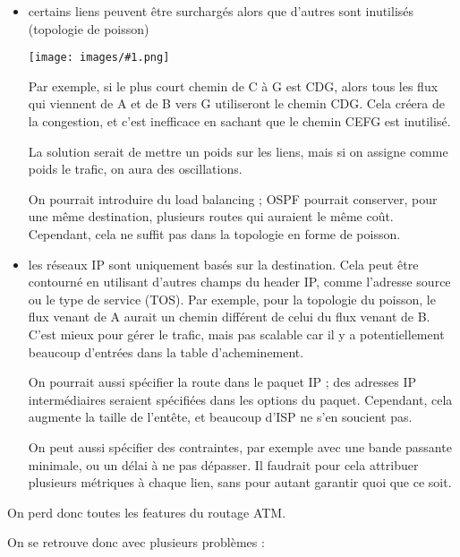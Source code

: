 \documentclass[10pt,a4paper]{report}
\newcommand{\dessin}[1]{\begin{center}\texttt{[image: images/\#1.png]}\end{center}}
\begin{document}
			\begin{itemize}
				\item certains liens peuvent être surchargés alors que d'autres sont inutilisés (topologie de poisson)
				
				\dessin{17}
				
				Par exemple, si le plus court chemin de C à G est CDG, alors tous les flux qui viennent de A et de B vers G utiliseront le chemin CDG. Cela créera de la congestion, et c'est inefficace en sachant que le chemin CEFG est inutilisé.
				
				La solution serait de mettre un poids sur les liens, mais si on assigne comme poids le trafic, on aura des oscillations.
				
				On pourrait introduire du load balancing ; OSPF pourrait conserver, pour une même destination, plusieurs routes qui auraient le même coût. Cependant, cela ne suffit pas dans la topologie en forme de poisson.
				
				
					
				\item les réseaux IP sont uniquement basés sur la destination. Cela peut être contourné en utilisant d'autres champs du header IP, comme l'adresse source ou le type de service (TOS). Par exemple, pour la topologie du poisson, le flux venant de A aurait un chemin différent de celui du flux venant de B.				
				C'est mieux pour gérer le trafic, mais pas scalable car il y a potentiellement beaucoup d'entrées dans la table d'acheminement.
		
		
				On pourrait aussi spécifier la route dans le paquet IP ; des adresses IP intermédiaires seraient spécifiées dans les options du paquet. Cependant, cela augmente la taille de l'entête, et beaucoup d'ISP ne s'en soucient pas.
		
				On peut aussi spécifier des contraintes, par exemple avec une bande passante minimale, ou un délai à ne pas dépasser. Il faudrait pour cela attribuer plusieurs métriques à chaque lien, sans pour autant garantir quoi que ce soit.
			\end{itemize}
	
			On perd donc toutes les features du routage ATM.
			
			On se retrouve donc avec plusieurs problèmes :
			
\end{document}
